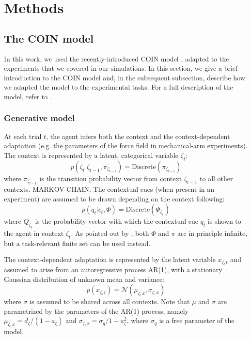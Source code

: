 \documentclass[a4paper,doc,floatsintext,natbib]{apa6}%
\begin{document}
\section{Methods}
\subsection{The COIN model}
In this work, we used the recently-introduced COIN model \citep{Heald_Contextual_2021}, adapted to the experiments that we covered in our simulations. In this section, we give a brief introduction to the COIN model and, in the subsequent subsection, describe how we adapted the model to the experimental tasks. For a full description of the model, refer to \cite{Heald_Contextual_2021}.

\subsubsection{Generative model}
At each trial $t$, the agent infers both the context and the context-dependent adaptation (e.g. the parameters of the force field in mechanical-arm experiments). The context is represented by a latent, categorical variable $\zeta_t$:
\begin{equation}
p(\zeta_t | \zeta_{t-1}, \pi_{\zeta_{t-1}}) = \text{Discrete}\left(\pi_{\zeta_{t-1}}\right)
\end{equation}
where $\pi_{\zeta_{t-1}}$ is the transition probability vector from context $\zeta_{t-1}$ to all other contexts. MARKOV CHAIN. The contextual cues (when present in an experiment) are assumed to be drawn depending on the context following:
\begin{equation}
p(q_t | c_t, \Phi) = \text{Discrete}(\Phi_{\zeta_t})
\end{equation}
where $Q_{\zeta_t}$ is the probability vector with which the contextual cue $q_t$ is shown to the agent in context $\zeta_t$. As pointed out by \cite{Heald_Contextual_2021}, both $\Phi$ and $\pi$ are in principle infinite, but a task-relevant finite set can be used instead.

The context-dependent adaptation is represented by the latent variable $x_{\zeta,t}$ and assumed to arise from an autoregressive process AR(1), with a stationary Gaussian distribution of unknown mean and variance:
\begin{equation}
p(x_{\zeta,t}) = \mathcal{N}(\mu_{\zeta,x}, \sigma_{\zeta,x})
\end{equation}
where $\sigma$ is assumed to be shared across all contexts. Note that $\mu$ and $\sigma$ are parametrized by the parameters of the AR(1) process, namely $\mu_{\zeta,x} = d_\zeta / (1 - a_\zeta)$ and $\sigma_{\zeta, x} = \sigma_q / 1 - a_\zeta^2$, where $\sigma_q$ is a free parameter of the model.
\end{document}
